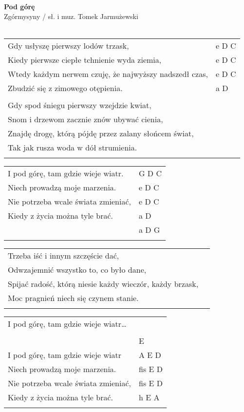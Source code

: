 \documentclass[a5paper]{article}
\begin{document}


\noindent
\fontsize{12pt}{15pt}\selectfont
\textbf{Pod górę} \\
\fontsize{8pt}{10pt}\selectfont
Zgórmysyny / sł. i muz. Tomek Jarmużewski \\ \\
\fontsize{10pt}{12pt}\selectfont
{}
\begin{tabular}{@{}p{9.5cm}p{3cm}@{}}
\noindent
Gdy usłyszę pierwszy lodów trzask, & e D C \\
Kiedy pierwsze ciepłe tchnienie wyda ziemia, & e D C \\
Wtedy każdym nerwem czuję, że najwyższy nadszedł czas, & e D C \\
Zbudzić się z zimowego otępienia. & a D \\ \\

Gdy spod śniegu pierwszy wzejdzie kwiat, \\
Snom i drzewom zacznie znów ubywać cienia, \\
Znajdę drogę, którą pójdę przez zalany słońcem świat, \\
Tak jak rusza woda w dół strumienia. \\ \\
\end{tabular}

\noindent
\begin{tabular}{@{}p{8.5cm}p{3cm}@{}}
I pod górę, tam gdzie wieje wiatr. & G D C \\
Niech prowadzą moje marzenia. & e D C \\
Nie potrzeba wcale świata zmieniać, & e D C \\
Kiedy z życia można tyle brać. & a D \\
					& a D G \\ \\
\end{tabular}

\noindent
\begin{tabular}{@{}p{8.5cm}p{3cm}@{}}
Trzeba iść i innym szczęście dać, \\
Odwzajemnić wszystko to, co było dane, \\
Spijać radość, którą niesie każdy wieczór, każdy brzask, \\
Moc pragnień niech się czynem stanie. \\ \\
\end{tabular}

\noindent
\begin{tabular}{@{}p{8.5cm}p{3cm}@{}}
	I pod górę, tam gdzie wieje wiatr… \\ \\
	& E \\
	I pod górę, tam gdzie wieje wiatr & A E D \\
	Niech prowadzą moje marzenia. & fis E D \\
	Nie potrzeba wcale świata zmieniać, & fis E D \\
	Kiedy z życia można tyle brać. & h E A \\ \\
\end{tabular}
\end{document}
